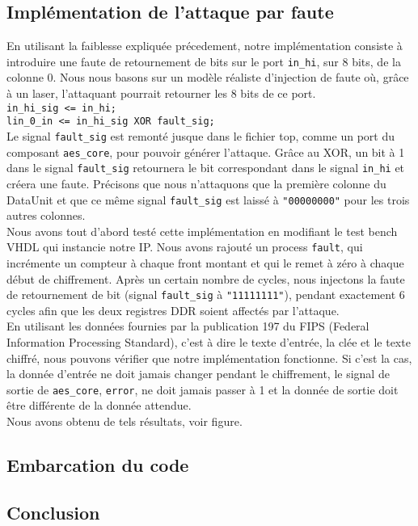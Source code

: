 \subsection{Implémentation de l'attaque par faute}

En utilisant la faiblesse expliquée précedement, notre implémentation
consiste à introduire une faute de retournement de bits sur le port
\texttt{in\_hi}, sur 8 bits, de la colonne 0. Nous nous basons sur un
modèle réaliste d'injection de faute où, grâce à un laser, l'attaquant
pourrait retourner les 8 bits de ce port.\\
\texttt{in\_hi\_sig <= in\_hi;\\  lin\_0\_in <= in\_hi\_sig XOR fault\_sig;} \\
Le signal \texttt{fault\_sig} est remonté jusque dans le fichier top, comme un
port du composant \texttt{aes\_core}, pour pouvoir générer l'attaque.
Grâce au XOR,
un bit à 1 dans le signal \texttt{fault\_sig} retournera le bit correspondant
dans le signal \texttt{in\_hi} et créera une faute.
Précisons que nous n'attaquons que la première colonne du DataUnit et que ce
même signal \texttt{fault\_sig} est laissé à \texttt{"00000000"} pour les trois
autres colonnes. \\
Nous avons tout d'abord testé cette implémentation en modifiant le test bench
VHDL qui instancie notre IP. Nous avons rajouté un process \texttt{fault},
qui incrémente un compteur à chaque front montant et qui le remet à zéro à
chaque début de chiffrement. Après un certain nombre de cycles, nous injectons
la faute de retournement de bit (signal \texttt{fault\_sig} à  \texttt{"11111111"}),
pendant exactement 6 cycles afin que les deux registres DDR soient affectés par
l'attaque. \\
En utilisant les données fournies par la publication 197 du FIPS (Federal Information
Processing Standard), c'est à dire le texte d'entrée, la clée et le texte chiffré,
nous pouvons vérifier que notre implémentation fonctionne. Si c'est la cas,
la donnée d'entrée ne doit jamais changer pendant le chiffrement, le signal
de sortie de \texttt{aes\_core}, \texttt{error}, ne doit jamais passer à 1 et
la donnée de sortie doit être différente de la donnée attendue. \\
Nous avons obtenu de tels résultats, voir figure.



\subsection{Embarcation du code}


\subsection{Conclusion}
